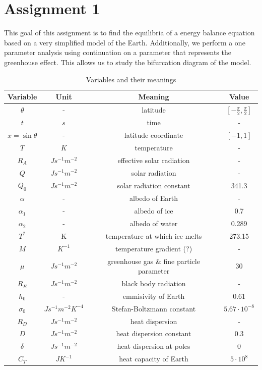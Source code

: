 \section{Assignment 1}
This goal of this assignment is to find the equilibria of a energy balance equation based on a very simplified model of the Earth.
Additionally, we perform a one parameter analysis using continuation on a parameter that represents the greenhouse effect. 
This allows us to study the bifurcation diagram of the model.

\begin{table}[H]
    \centering
    \begin{tabular}{|c|c|c|c|}
        \hline
        Variable & Unit &  Meaning & Value\\
        \hline
        $\theta$ & - & latitude & $[-\frac{\pi}{2}, \frac{\pi}{2}]$\\
        $t $ & $s$ & time & -\\
        $x = \sin \theta$ & -  & latitude coordinate & $[-1, 1]$\\
        $T $ & $K$ & temperature & -\\
        $R_A $ & $J s^{-1} m^{-2}$ & effective solar radiation & - \\
        $Q $ & $J s^{-1} m^{-2}$ & solar radiation & -\\
        $Q_0 $ & $J s^{-1} m^{-2}$ & solar radiation constant & 341.3\\
        $\alpha$ & - & albedo of Earth & -\\
        $\alpha_1$ & - & albedo of ice & 0.7\\
        $\alpha_2$ & - & albedo of water & 0.289\\
        $T^{*} $ & K & temperature at which ice melts & 273.15\\
        $M$ & $K^{-1}$ & temperature gradient (?) & -\\
        $\mu $ & $J s^{-1} m^{-2}$ & greenhouse gas \& fine particle parameter & 30\\
        $R_E $ & $J s^{-1} m^{-2}$ & black body radiation & -\\
        $h_0$ & - & emmisivity of Earth & 0.61\\
        $\sigma_0 $ & $J s^{-1} m^{-2} K^{-4}$ & Stefan-Boltzmann constant & $5.67 \cdot 10^{-8}$\\
        $R_D $ & $J s^{-1} m^{-2}$ & heat dispersion & -\\
        $D $ & $J s^{-1} m^{-2}$ & heat dispersion constant & 0.3\\
        $\delta $ & $J s^{-1} m^{-2}$ & heat dispersion at poles & 0\\
        $C_T $ & $J K^{-1}$  & heat capacity of Earth & $5 \cdot 10^{8}$\\
        \hline
    \end{tabular}
    \caption{Variables and their meanings}
    \label{tab:vars}
\end{table}

